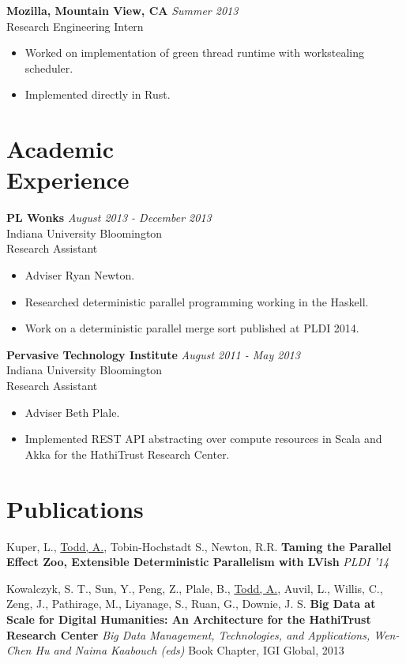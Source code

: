 \documentclass[margin]{res}
\begin{document}
\begin{resume}
 {\bf Mozilla, Mountain View, CA} \hfill \textit{Summer 2013} \\
 Research Engineering Intern
 \begin{itemize} \itemsep -2pt  %
 \item Worked on implementation of green thread runtime with workstealing scheduler.
 \item Implemented directly in Rust.  
 \end{itemize}
  
\section{Academic \\ Experience}

 {\bf PL Wonks} \hfill \textit{August 2013 - December 2013} \\
 Indiana University Bloomington \\
 Research Assistant
 \begin{itemize} \itemsep -2pt  %
 \item Adviser Ryan Newton.
 \item Researched deterministic parallel programming working in the Haskell.
 \item Work on a deterministic parallel merge sort published at PLDI 2014.
 \end{itemize}


 {\bf Pervasive Technology Institute} \hfill \textit{August 2011 - May 2013} \\
 Indiana University Bloomington \\
 Research Assistant
 \begin{itemize} \itemsep -2pt  %
 \item Adviser Beth Plale.
 \item Implemented REST API abstracting over compute resources in Scala and Akka for the HathiTrust Research Center.
 \end{itemize}
 
\section{Publications}

Kuper, L., \underline{Todd, A.}, Tobin-Hochstadt S., Newton, R.R. {\bf Taming the Parallel Effect Zoo, Extensible Deterministic Parallelism with LVish} \textit{PLDI '14} 

Kowalczyk, S. T., Sun, Y., Peng, Z., Plale, B., \underline{Todd, A.}, Auvil, L., Willis, C., Zeng, J., Pathirage, M., Liyanage, S., Ruan, G., Downie, J. S. {\bf Big Data at Scale for Digital Humanities: An Architecture for the HathiTrust Research Center} \textit{Big Data Management, Technologies, and Applications, Wen-Chen Hu and Naima Kaabouch (eds)} Book Chapter, IGI Global, 2013


\end{resume}
\end{document}
